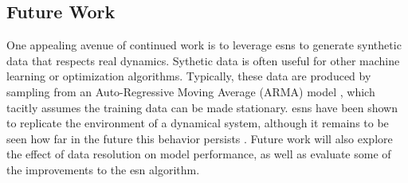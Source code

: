 \subsection{Future Work}
One appealing avenue of continued work is to leverage \glspl{esn} to generate
synthetic data that respects real dynamics. Sythetic data is often useful for
other machine learning or optimization algorithms. Typically, these data are
produced by sampling from an Auto-Regressive Moving Average (ARMA) model \cite{baker_optimal_2018, garcia_dynamic_2016}, which tacitly assumes the
training data can be made stationary. \glspl{esn} have been shown to replicate
the environment of a dynamical system, although it remains to be seen how far
in the future this behavior persists \cite{pathak_using_2017,pathak_model-free_2018}.
Future work will also explore the effect of data resolution on model
performance, as well as evaluate some of the improvements to the \gls{esn}
algorithm.
